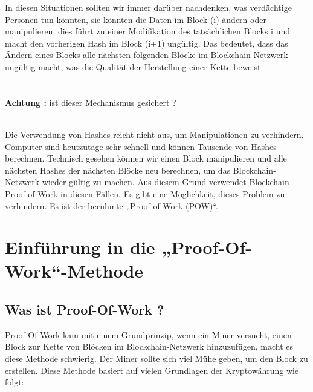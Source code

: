\documentclass[ngerman]{scrreprt}
\begin{document}
In diesen Situationen sollten wir immer darüber nachdenken, was verdächtige Personen tun könnten, sie könnten die Daten im Block (i) ändern oder manipulieren.
dies führt zu einer Modifikation des tatsächlichen Blocks i und macht den vorherigen Hash im Block (i+1) ungültig. Das bedeutet, dass das Ändern eines Blocks alle nächsten folgenden Blöcke im Blockchain-Netzwerk ungültig macht, was die Qualität der Herstellung einer Kette beweist.\\ \\ \\ 
\color{red}
\huge{\textbf{Achtung :}}
\color{black}
\large
ist dieser Mechanismus gesichert ?\\ \\
\normalsize
 	
Die Verwendung von Hashes reicht nicht aus, um Manipulationen zu verhindern. Computer sind heutzutage sehr schnell und können Tausende von Hashes berechnen. Technisch gesehen können wir einen Block manipulieren und alle nächsten Hashes der nächsten Blöcke neu berechnen, um das Blockchain-Netzwerk wieder gültig zu machen. Aus diesem Grund verwendet Blockchain Proof of Work
in diesen Fällen. Es gibt eine Möglichkeit, dieses Problem zu verhindern. Es ist der berühmte „Proof of Work (POW)“.	

\chapter[Proof-Of-Work]{Einführung in die „Proof-Of-Work“-Methode}	

\section{Was ist Proof-Of-Work ?}
Proof-Of-Work kam mit einem Grundprinzip, wenn ein Miner versucht, einen Block zur Kette von Blöcken im Blockchain-Netzwerk hinzuzufügen, macht es diese Methode schwierig. Der Miner sollte sich viel Mühe geben, um den Block zu erstellen. Diese Methode basiert auf vielen Grundlagen der Kryptowährung wie folgt:
\end{document}
